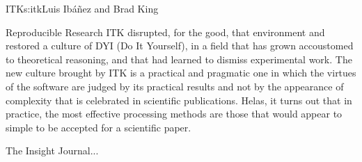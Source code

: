 \begin{aosachapter}{ITK}{s:itk}{Luis Ib\'{a}\~{n}ez and Brad King}
\begin{aosasect1}{Reproducible Research}
ITK disrupted, for the good, that environment and restored a culture
of DYI (Do It Yourself), in a field that has grown accoustomed to
theoretical reasoning, and that had learned to dismiss experimental
work. The new culture brought by ITK is a practical and pragmatic one
in which the virtues of the software are judged by its practical results
and not by the appearance of complexity that is celebrated in scientific
publications. Helas, it turns out that in practice, the most effective
processing methods are those that would appear to simple to be accepted
for a scientific paper.

The Insight Journal...
\end{aosasect1}

\end{aosachapter}
